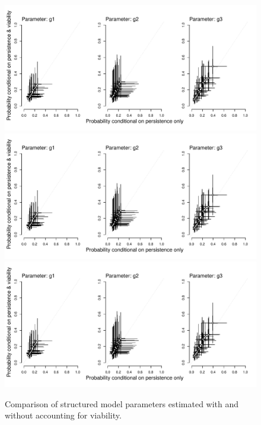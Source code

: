 \documentclass[12pt, oneside]{article}   	%
\begin{document}
 \begin{figure}[!h]
        \centering
        \includegraphics[page=1,scale=.5]{../../figures/compare-structured-parameters-1to1.pdf} 
        \includegraphics[page=2,scale=.5]{../../figures/compare-structured-parameters-1to1.pdf} 
        \includegraphics[page=3,scale=.5]{../../figures/compare-structured-parameters-1to1.pdf} 
            \caption{  Comparison of structured model parameters estimated with and without accounting for viability.  }
 \label{fig:germination-estimates-population}
\end{figure}


\end{document}

